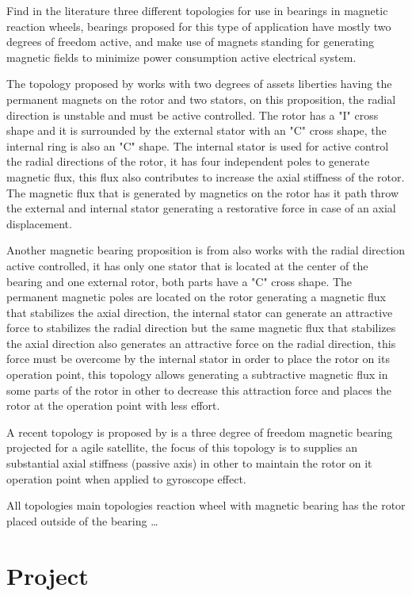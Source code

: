 \documentclass[journal,a4paper,oneside,twocolumn]{IEEEtran}
\begin{document}
Find in the literature three different topologies for use in bearings in magnetic reaction wheels, bearings proposed for this type of application have mostly two degrees of freedom active, and make use of magnets standing for generating magnetic fields to minimize power consumption active electrical system. 

The topology proposed by \cite{Bernus1998} works with two degrees of assets liberties having the permanent magnets on the rotor and two stators, on this proposition, the radial direction is unstable and must be active controlled. The rotor has a "I" cross shape and it is surrounded by the external stator with an "C" cross shape, the internal ring is also an "C" shape. The internal stator is used for active control the radial directions of the rotor, it has four independent poles to generate magnetic flux, this flux also contributes to increase the axial stiffness of the rotor. The magnetic flux that is generated by magnetics on the rotor has it path throw the external and internal stator generating a restorative force in case of an axial displacement. 

Another magnetic bearing proposition is from \cite{Scharfe2001} also works with the radial direction active controlled, it has only one stator that is located at the center of the bearing and one external rotor, both parts have a "C" cross shape. The permanent magnetic poles are located on the rotor generating a magnetic flux that stabilizes the axial direction, the internal stator can generate an attractive force to stabilizes the radial direction but the same magnetic flux that stabilizes the axial direction also generates an attractive force on the radial direction, this force must be overcome by the internal stator in order to place the rotor on its operation point, this topology allows generating a subtractive magnetic flux in some parts of the rotor in other to decrease this attraction force and places the rotor at the operation point with less effort. 

A recent topology is proposed by \cite{Bangcheng2012} is a three degree of freedom magnetic bearing projected for a agile satellite, the focus of this topology is to supplies an substantial axial stiffness (passive axis) in other to maintain the rotor on it operation point when applied to  gyroscope effect.

All topologies main topologies reaction wheel with magnetic bearing has the rotor placed outside of the bearing \ldots

\section{Project}
\end{document}

